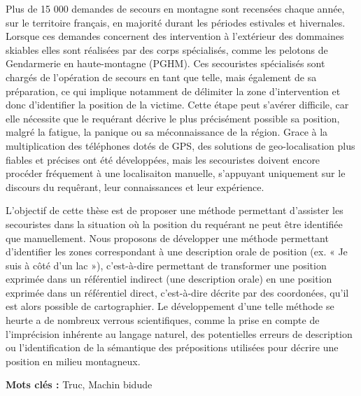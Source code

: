 
Plus de 15 000 demandes de secours en montagne sont recensées chaque
année, sur le territoire français, en majorité durant les périodes
estivales et hivernales. Lorsque ces demandes concernent des
intervention à l'extérieur des dommaines skiables elles sont réalisées
par des corps spécialisés, comme les pelotons de Gendarmerie en
haute-montagne (PGHM). Ces secouristes spécialisés sont chargés de
l'opération de secours en tant que telle, mais également de sa
préparation, ce qui implique notamment de délimiter la zone
d'intervention et donc d'identifier la position de la victime. Cette
étape peut s'avérer difficile, car elle nécessite que le requérant
décrive le plus précisément possible sa position, malgré la fatigue,
la panique ou sa méconnaissance de la région. Grace à la
multiplication des téléphones dotés de GPS, des solutions de
geo-localisation plus fiables et précises ont été développées, mais
les secouristes doivent encore procéder fréquement à une localisaiton
manuelle, s'appuyant uniquement sur le discours du requêrant, leur
connaissances et leur expérience.

L'objectif de cette thèse est de proposer une méthode permettant
d'assister les secouristes dans la situation où la position du
requérant ne peut être identifiée que manuellement. Nous proposons de
développer une méthode permettant d'identifier les zones correspondant
à une description orale de position (ex. « Je suis à côté d'un lac »),
c'est-à-dire permettant de transformer une position exprimée dans un
référentiel indirect (une description orale) en une position exprimée
dans un référentiel direct, c'est-à-dire décrite par des coordonées,
qu'il est alors possible de cartographier. Le développement d'une
telle méthode se heurte a de nombreux verrous scientifiques, comme la
prise en compte de l'imprécision inhérente au langage naturel, des
potentielles erreurs de description ou l’identification de la
sémantique des prépositions utilisées pour décrire une position en
milieu montagneux.

\noident \textbf{Mots clés :} Truc, Machin bidude\par


